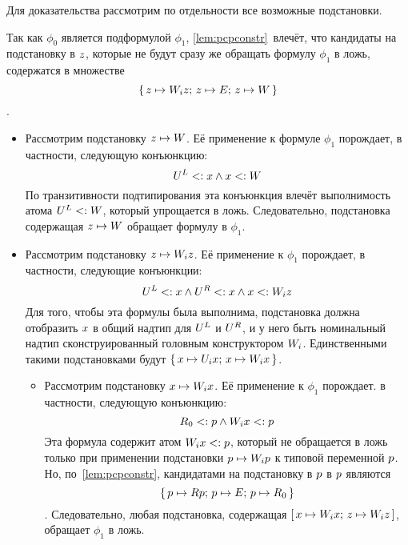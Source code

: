 \begin{proof*}
Для доказательства рассмотрим по отдельности все возможные подстановки.

Так как $\phi_{0}$ является подформулой $\phi_1$, \autoref{lem:pcpconstr}~влечёт, что 
кандидаты на подстановку в $z$, которые не будут сразу же обращать формулу $\phi_{1}$ в ложь, содержатся в множестве \[\lbrace \, z \mapsto {W}_{i}z; \, z \mapsto {E}; \, z \mapsto {W} \, \rbrace\].

\begin{itemize}
    \item 
        Рассмотрим подстановку $z \mapsto {W}$. Её применение к формуле $\phi_{1}$ порождает, в частности, следующую конъюнкцию:
        \[
            {U}^{L} <: x \land x <: {W}
        \]
        По транзитивности подтипирования эта конъюнкция влечёт выполнимость атома ${U}^{L} <: {W}$, который упрощается в ложь. Следовательно, подстановка содержащая $z \mapsto {W}$ обращает формулу в $\phi_1$.
    \item
        Рассмотрим подстановку $z \mapsto {W}_{i}z$. Её применение к $\phi_{1}$ порождает, в частности, следующие конъюнкции:
        \[
         {U}^{L} <: x \land {U}^{R} <: x \land x <: {W}_{i}z
        \]
        Для того, чтобы эта формулы была выполнима, подстановка должна отобразить $x$ в общий надтип для ${U}^{L}$ и ${U}^{R}$, и у него быть номинальный надтип сконструированный головным конструктором ${W}_{i}$. Единственными такими подстановками будут $\lbrace \, x \mapsto {U}_{i}x; \, x \mapsto {W}_{i}x \, \rbrace$.
        \begin{itemize}
            \item 
                Рассмотрим подстановку $x \mapsto {W}_{i}x$. Её применение к $\phi_{1}$ порождает. в частности, следующую конъюнкцию:
                \[
                 {R}_{0} <: p \land {W}_{i}x <: p
                \]
                Эта формула содержит атом ${W}_{i}x <: p$, который не обращается в ложь только при применении подстановки $p \mapsto {W}_{i}p$ к типовой переменной $p$. Но, по~\autoref{lem:pcpconstr}, кандидатами на подстановку в $p$ в $p$ являются \[\lbrace \, p \mapsto {R}p; \, p \mapsto {E}; \, p \mapsto {R}_{0} \, \rbrace\]. Следовательно, любая подстановка, содержащая $\textrm{[} \, x \mapsto {W}_{i}x; \, z \mapsto {W}_{i}z \, \textrm{]}$, обращает $\phi_1$ в ложь.

\end{itemize}
\end{itemize}
\end{proof*}
